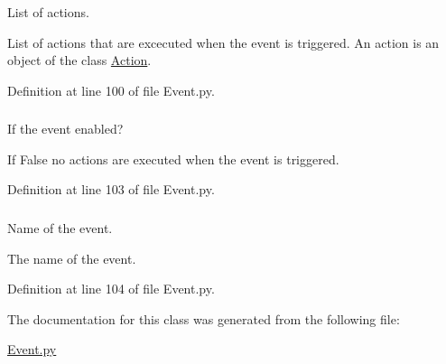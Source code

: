 List of actions. 

List of actions that are excecuted when the event is triggered. An action is an object of the class \hyperlink{class_event_1_1_action}{Action}. 

Definition at line 100 of file Event.py.

\hypertarget{class_event_1_1_event_a265d75b269c4b7925eada6a68dd9490f}{
\subsubsection[{\_\-\_\-enabled}]{}}
\label{class_event_1_1_event_a265d75b269c4b7925eada6a68dd9490f}


If the event enabled? 

If False no actions are executed when the event is triggered. 

Definition at line 103 of file Event.py.

\hypertarget{class_event_1_1_event_a6b410ecc97e65ec2003daeb67b1a9c60}{
\subsubsection[{name}]{}}
\label{class_event_1_1_event_a6b410ecc97e65ec2003daeb67b1a9c60}


Name of the event. 

The name of the event. 

Definition at line 104 of file Event.py.



The documentation for this class was generated from the following file:\begin{DoxyCompactItemize}
\item 
\hyperlink{_event_8py}{Event.py}\end{DoxyCompactItemize}
